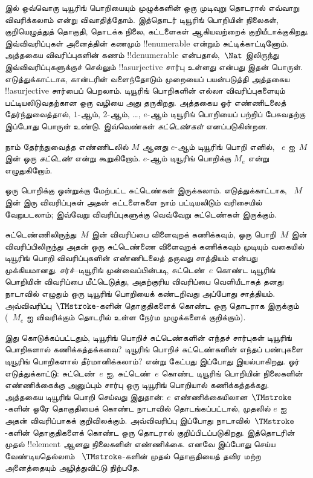 \documentclass[../../../include/open-logic-section]{subfiles}
\begin{document}


 இல் ஒவ்வொரு டியூரிங் பொறியையும் முழுக்களின் ஒரு
முடிவுறு தொடரால் எவ்வாறு விவரிக்கலாம் என்று விவாதித்தோம். இத்தொடர்
டியூரிங் பொறியின் நிலைகள், குறியெழுத்துத் தொகுதி, தொடக்க நிலை,
கட்டளைகள் ஆகியவற்றைக் குறியீடாக்குகிறது. இவ்விவரிப்புகள் அனைத்தின்
கணமும் !!{enumerable} என்றும் சுட்டிக்காட்டினோம். அத்தகைய
விவரிப்புகளின் கணம் !!{denumerable} என்பதால்,~$\Nat$ இலிருந்து
இவ்விவரிப்புகளுக்குச் செல்லும் !!a{surjective} சார்பு உள்ளது என்பது
இதன் பொருள். எடுத்துக்காட்டாக, கான்டரின் வளைந்தோடும் முறையைப்
பயன்படுத்தி அத்தகைய !!a{surjective} சார்பைப் பெறலாம். டியூரிங்
பொறிகளின் எல்லா விவரிப்புகளையும் பட்டியலிடுவதற்கான ஒரு வழியை அது
தருகிறது. அத்தகைய ஓர் எண்ணிடலைத் தேர்ந்துவைத்தால், $1$-ஆம், $2$-ஆம்,
\dots, $e$-ஆம் டியூரிங் பொறியைப் பற்றிப் பேசுவதற்கு இப்போது பொருள்
உண்டு. இவ்வெண்கள் \emph{சுட்டெண்கள்} எனப்படுகின்றன.

\begin{defn}
நாம் தேர்ந்துவைத்த எண்ணிடலில் $M$ ஆனது $e$-ஆம் டியூரிங் பொறி எனில்,
~$e$ ஐ~$M$ இன் ஒரு \emph{சுட்டெண்} என்று கூறுகிறோம். $e$-ஆம்
டியூரிங் பொறிக்கு $M_e$ என்று எழுதுகிறோம்.
\end{defn}

ஒரு பொறிக்கு ஒன்றுக்கு மேற்பட்ட சுட்டெண்கள் இருக்கலாம். எடுத்துக்காட்டாக,
~$M$ இன் இரு விவரிப்புகள் அதன் கட்டளைகளை நாம் பட்டியலிடும் வரிசையில்
வேறுபடலாம்; இவ்வேறு விவரிப்புகளுக்கு வெவ்வேறு சுட்டெண்கள் இருக்கும்.

சுட்டெண்ணிலிருந்து~$M$ இன் விவரிப்பை விளைவுறக் கணிக்கவும், ஒரு
பொறி~$M$ இன் விவரிப்பிலிருந்து அதன் ஒரு சுட்டெண்ணை விளைவுறக் கணிக்கவும்
முடியும் வகையில் டியூரிங் பொறி விவரிப்புகளின் எண்ணிடலைத் தருவது
சாத்தியம் என்பது முக்கியமானது. சர்ச்--டியூரிங் முன்வைப்பின்படி,
சுட்டெண்~$e$ கொண்ட டியூரிங் பொறியின் விவரிப்பை மீட்டெடுத்து, அதற்குரிய
விவரிப்பை வெளியீடாகத் தனது நாடாவில் எழுதும் ஒரு டியூரிங் பொறியைக்
கண்டறிவது அப்போது சாத்தியம். அவ்விவரிப்பு~$\TMstroke$-களின்
தொகுதிகளைக் கொண்ட ஒரு தொடராக இருக்கும் (~$M_e$ ஐ விவரிக்கும் தொடரில்
உள்ள நேர்ம முழுக்களைக் குறிக்கும்).

இது கொடுக்கப்பட்டதும், டியூரிங் பொறிச் சுட்டெண்களின் எந்தச் சார்புகள்
டியூரிங் பொறிகளால் கணிக்கத்தக்கவை? டியூரிங் பொறிச் சுட்டெண்களின்
எந்தப் பண்புகளை டியூரிங் பொறிகளால் தீர்மானிக்கலாம்? என்று கேட்பது
இப்போது இயல்பாகிறது. ஓர் எடுத்துக்காட்டு: சுட்டெண்~$e$ ஐ, சுட்டெண்~$e$
கொண்ட டியூரிங் பொறியின் நிலைகளின் எண்ணிக்கைக்கு அனுப்பும் சார்பு ஒரு
டியூரிங் பொறியால் கணிக்கத்தக்கது. அத்தகைய டியூரிங் பொறி செய்வது இதுதான்:
$e$ எண்ணிக்கையிலான~$\TMstroke$-களின் ஒரே தொகுதியைக் கொண்ட நாடாவில்
தொடங்கப்பட்டால், முதலில் $e$ ஐ அதன் விவரிப்பாகக் குறிவிலக்கும்.
அவ்விவரிப்பு இப்போது நாடாவில்~$\TMstroke$-களின் தொகுதிகளைக் கொண்ட
ஒரு தொடரால் குறிப்பிடப்படுகிறது. இத்தொடரின் முதல் !!{element} ஆனது
நிலைகளின் எண்ணிக்கை. எனவே இப்போது செய்ய வேண்டியதெல்லாம்
~$\TMstroke$-களின் முதல் தொகுதியைத் தவிர மற்ற அனைத்தையும் அழித்துவிட்டு
நிற்பதே.
\end{document}
